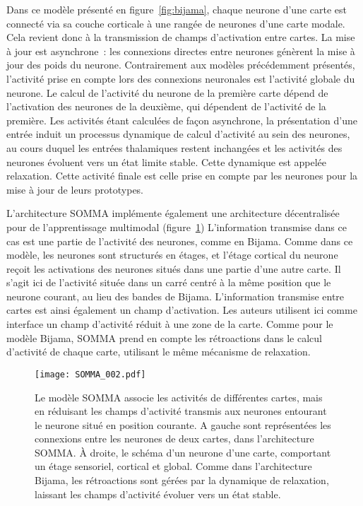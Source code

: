 \documentclass[../main]{subfiles}
\begin{document}
Dans ce modèle présenté en figure~\ref{fig:bijama}, chaque neurone d'une carte est connecté via sa couche corticale à une rangée de neurones d'une carte modale. Cela revient donc à la transmission de champs d'activation entre cartes.
La mise à jour est asynchrone~: les connexions directes entre neurones génèrent la mise à jour des poids du neurone. Contrairement aux modèles précédemment présentés, l'activité prise en compte lors des connexions neuronales est l'activité globale du neurone. Le calcul de l'activité du neurone de la première carte dépend de l'activation des neurones de la deuxième, qui dépendent de l'activité de la première.
Les activités étant calculées de façon asynchrone, la présentation d'une entrée induit un processus dynamique de calcul d'activité au sein des neurones, au cours duquel les entrées thalamiques restent inchangées et les activités des neurones évoluent vers un état limite stable. Cette dynamique est appelée relaxation.
Cette activité finale est celle prise en compte par les neurones pour la mise à jour de leurs prototypes.

L'architecture SOMMA implémente également une architecture décentralisée pour de l'apprentissage multimodal (figure~\ref{fig:somma})
L'information transmise dans ce cas est une partie de l'activité des neurones, comme en Bijama. Comme dans ce modèle, les neurones sont structurés en étages, et l'étage cortical du neurone reçoit les activations des neurones situés dans une partie d'une autre carte.
Il s'agit ici de l'activité située dans un carré centré à la même position que le neurone courant, au lieu des bandes de Bijama.
L'information transmise entre cartes est ainsi également un champ d'activation. Les auteurs utilisent ici comme interface un champ d'activité réduit à une zone de la carte. Comme pour le modèle Bijama, SOMMA prend en compte les rétroactions dans le calcul d'activité de chaque carte, utilisant le même mécanisme de relaxation.


\begin{figure}
    \centering\texttt{[image: SOMMA\_002.pdf]}
    \caption{
        Le modèle SOMMA \parencite{lefort_unlearning_2011,lefort_apprentissage_2012} associe les activités de différentes cartes, mais en réduisant les champs d'activité transmis aux neurones entourant le neurone situé en position courante. A gauche sont représentées les connexions entre les neurones de deux cartes, dans l'architecture SOMMA. \`A droite, le schéma d'un neurone d'une carte, comportant un étage sensoriel, cortical et global.
        Comme dans l'architecture Bijama, les rétroactions sont gérées par la dynamique de relaxation, laissant les champs d'activité évoluer vers un état stable.
    \label{fig:somma}}
\end{figure}
\end{document}
